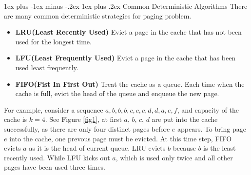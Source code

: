 \documentclass[11pt]{article}
\makeatletter
\renewcommand{\subsection}{\@startsection{subsection}{2}{0mm}%
                                   {1ex plus -1ex minus -.2ex}%
                                   {1ex plus .2ex}%
                                   {\normalfont\large\bfseries}}%
\makeatother
\begin{document}
\subsection{Common Deterministic Algorithms}
There are many common deterministic strategies for paging problem.
\begin{itemize}
	\item {\bf LRU(Least Recently Used)} Evict a page in the cache that has not been used for the longest time.
	\item {\bf LFU(Least Frequently Used)} Evict a page in the cache that has been used least frequently.
	\item {\bf FIFO(Fist In First Out)} Treat the cache as a queue. Each time when the cache is full, evict the head of the queue and enqueue the new page.
\end{itemize}
For example, consider a sequence $a, b, b, b, c, c, c, d, d, a, e, f$, and capacity of the cache is $k=4$. See Figure \ref{fig1}, at first $a$, $b$, $c$, $d$ are put into the cache successfully, as there are only four distinct pages before $e$ appears. To bring page $e$ into the cache, one prevous page must be evicted. At this time step, FIFO evicts $a$ as it is the head of current queue. LRU evicts $b$ because $b$ is the least recently used. While LFU kicks out $a$, which is used only twice and all other pages have been used three times.
\end{document}
